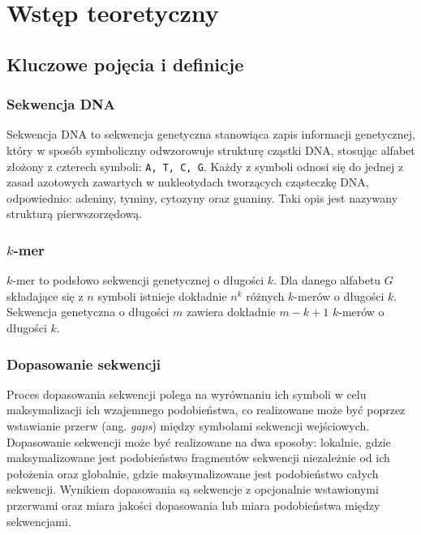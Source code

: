 \cleardoublepage
\section{Wstęp teoretyczny}

    \subsection{Kluczowe pojęcia i definicje}

        \subsubsection{Sekwencja DNA}

        Sekwencja DNA to sekwencja genetyczna stanowiąca zapis informacji genetycznej, który w sposób symboliczny odwzorowuje strukturę cząstki DNA, stosując alfabet złożony z czterech symboli: \texttt{A, T, C, G}. Każdy z symboli odnosi się do jednej z zasad azotowych zawartych w nukleotydach tworzących cząsteczkę DNA, odpowiednio: adeniny, tyminy, cytozyny oraz guaniny.
        Taki opis jest nazywany strukturą pierwszorzędową.

        \subsubsection{$k$-mer}

            $k$-mer to podsłowo sekwencji genetycznej o długości $k$. Dla danego alfabetu $G$ składające się z $n$ symboli istnieje dokładnie $n^k$ różnych $k$-merów o długości $k$. Sekwencja genetyczna o długości $m$ zawiera dokładnie $m - k + 1$ $k$-merów o długości $k$.


        \subsubsection{Dopasowanie sekwencji}

            Proces dopasowania sekwencji polega na wyrównaniu ich symboli w celu maksymalizacji ich wzajemnego podobieństwa, co realizowane może być poprzez wstawianie przerw (ang. \textit{gaps}) między symbolami sekwencji wejściowych. Dopasowanie sekwencji może być realizowane na dwa sposoby: lokalnie, gdzie maksymalizowane jest podobieństwo fragmentów sekwencji niezależnie od ich położenia oraz globalnie, gdzie maksymalizowane jest podobieństwo całych sekwencji. Wynikiem dopasowania są sekwencje z opcjonalnie wstawionymi przerwami oraz miara jakości dopasowania lub miara podobieństwa między sekwencjami.

